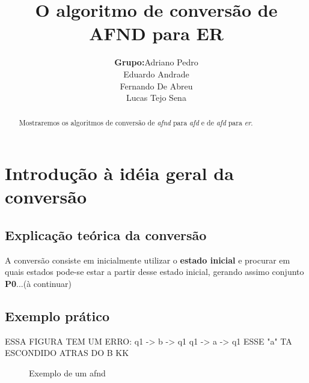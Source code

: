 \documentclass[a4paper,10pt]{article} %
\title{O algoritmo de conversão de AFND para ER}
\author{
    \begin{tabular}{ll}
        \textbf{Grupo:} &
        Adriano Pedro \tabularnewline &
        Eduardo Andrade\tabularnewline &
        Fernando De Abreu\tabularnewline &
        Lucas Tejo Sena\tabularnewline
    \end{tabular}
}
\begin{document}
\maketitle

\begin{abstract}

Mostraremos os algoritmos de conversão de \textit{afnd} para \textit{afd} e de \textit{afd} para \textit{er}.

\end{abstract}


\section{Introdução à idéia geral da conversão}
\subsection{Explicação teórica da conversão}
A conversão consiste em inicialmente utilizar o \textbf{estado inicial}
e procurar em quais estados pode-se estar a partir desse estado inicial, 
gerando assimo conjunto \textbf{P0}...(à continuar)

\subsection{Exemplo prático}

ESSA FIGURA TEM UM ERRO: q1 -> b -> q1 
                         q1 -> a -> q1
                         ESSE "a" TA ESCONDIDO ATRAS DO B KK
\begin{figure}[H]%
     \centering %
      \caption{Exemplo de um afnd}
      \label{fig:my_label}
\end{figure}          
\end{document}
